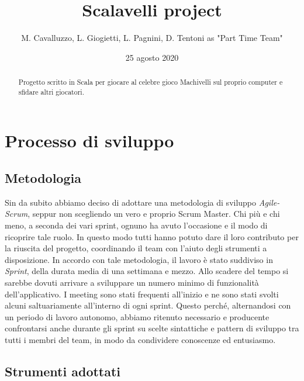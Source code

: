 \documentclass[a4paper,10pt]{article}
\title{Scalavelli project}
\date{25 agosto 2020}
\author{M. Cavalluzzo, L. Giogietti, L. Pagnini, D. Tentoni as "Part Time Team"}
\begin{document}
    \maketitle
    \newpage

    \begin{abstract}
        Progetto scritto in Scala per giocare al celebre gioco Machivelli sul proprio computer e sfidare altri giocatori.
    \end{abstract}

    \tableofcontents

    \newpage


    \section{Processo di sviluppo}

    \subsection{Metodologia}
    Sin da subito abbiamo deciso di adottare una metodologia di sviluppo \textit{Agile-Scrum}, seppur non scegliendo un vero e proprio Scrum Master. Chi più e chi meno, a seconda dei vari sprint, ognuno ha avuto l'occasione e il modo di ricoprire tale ruolo. In questo modo tutti hanno potuto dare il loro contributo per la riuscita del progetto, coordinando il team con l'aiuto degli strumenti a disposizione. In accordo con tale metodologia, il lavoro è stato suddiviso in \textit{Sprint}, della durata media di una settimana e mezzo. Allo scadere del tempo si sarebbe dovuti arrivare a sviluppare un numero minimo di funzionalità dell'applicativo. I meeting sono stati frequenti all'inizio e ne sono stati svolti alcuni saltuariamente all'interno di ogni sprint. Questo perché, alternandosi con un periodo di lavoro autonomo, abbiamo ritenuto necessario e producente confrontarsi anche durante gli sprint su scelte sintattiche e pattern di sviluppo tra tutti i membri del team, in modo da condividere conoscenze ed entusiasmo.

    \subsection{Strumenti adottati}
\end{document}
